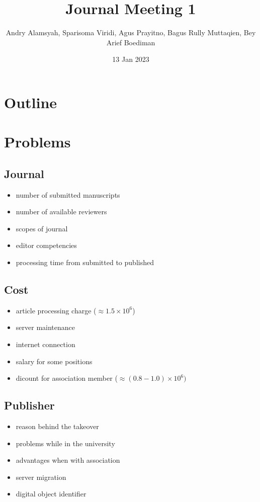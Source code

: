 \documentclass{beamer}
\title{Journal Meeting 1}
\author{Andry Alamsyah, Sparisoma Viridi, Agus Prayitno, \newline Bagus Rully Muttaqien, Bey Arief Boediman}
\date{13 Jan 2023}
\institute{Asosiasi Ilmuwan Data Indonesia}
\begin{document}
\begin{frame}
\titlepage
\end{frame}

\section*{Outline}

\begin{frame}
\tableofcontents
\end{frame}

\section{Problems}

\subsection{Journal}
\begin{frame}
  \begin{itemize}
    \item number of submitted manuscripts
    \item number of available reviewers
    \item scopes of journal 
    \item editor competencies
    \item processing time from submitted to published
  \end{itemize}
\end{frame}

\subsection{Cost}
\begin{frame}
  \begin{itemize}
    \item article processing charge ($\approx 1.5\times 10^6$)
    \item server maintenance
    \item internet connection
    \item salary for some positions 
    \item dicount for association member ($ \approx(0.8 - 1.0) \times 10^6)$
  \end{itemize}
\end{frame}

\subsection{Publisher}
\begin{frame}
  \begin{itemize}
    \item reason behind the takeover
    \item problems while in the university
    \item advantages when with association
    \item server migration
    \item digital object identifier
  \end{itemize}
\end{frame}
\end{document}

